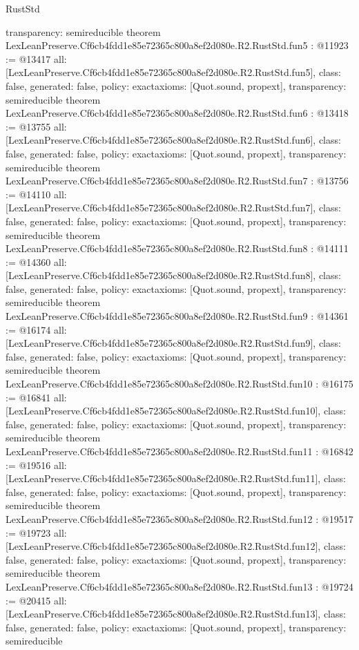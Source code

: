 \begin{lexlean}{RustStd}
\begin{coremodule}
{  transparency: semireducible
}
theorem LexLeanPreserve.Cf6cb4fdd1e85e72365c800a8ef2d080e.R2.RustStd.fun5 : @11923 := @13417 {
  all: [LexLeanPreserve.Cf6cb4fdd1e85e72365c800a8ef2d080e.R2.RustStd.fun5],
  class: false,
  generated: false,
  policy: exact{axioms: [Quot.sound, propext]},
  transparency: semireducible
}
theorem LexLeanPreserve.Cf6cb4fdd1e85e72365c800a8ef2d080e.R2.RustStd.fun6 : @13418 := @13755 {
  all: [LexLeanPreserve.Cf6cb4fdd1e85e72365c800a8ef2d080e.R2.RustStd.fun6],
  class: false,
  generated: false,
  policy: exact{axioms: [Quot.sound, propext]},
  transparency: semireducible
}
theorem LexLeanPreserve.Cf6cb4fdd1e85e72365c800a8ef2d080e.R2.RustStd.fun7 : @13756 := @14110 {
  all: [LexLeanPreserve.Cf6cb4fdd1e85e72365c800a8ef2d080e.R2.RustStd.fun7],
  class: false,
  generated: false,
  policy: exact{axioms: [Quot.sound, propext]},
  transparency: semireducible
}
theorem LexLeanPreserve.Cf6cb4fdd1e85e72365c800a8ef2d080e.R2.RustStd.fun8 : @14111 := @14360 {
  all: [LexLeanPreserve.Cf6cb4fdd1e85e72365c800a8ef2d080e.R2.RustStd.fun8],
  class: false,
  generated: false,
  policy: exact{axioms: [Quot.sound, propext]},
  transparency: semireducible
}
theorem LexLeanPreserve.Cf6cb4fdd1e85e72365c800a8ef2d080e.R2.RustStd.fun9 : @14361 := @16174 {
  all: [LexLeanPreserve.Cf6cb4fdd1e85e72365c800a8ef2d080e.R2.RustStd.fun9],
  class: false,
  generated: false,
  policy: exact{axioms: [Quot.sound, propext]},
  transparency: semireducible
}
theorem LexLeanPreserve.Cf6cb4fdd1e85e72365c800a8ef2d080e.R2.RustStd.fun10 : @16175 := @16841 {
  all: [LexLeanPreserve.Cf6cb4fdd1e85e72365c800a8ef2d080e.R2.RustStd.fun10],
  class: false,
  generated: false,
  policy: exact{axioms: [Quot.sound, propext]},
  transparency: semireducible
}
theorem LexLeanPreserve.Cf6cb4fdd1e85e72365c800a8ef2d080e.R2.RustStd.fun11 : @16842 := @19516 {
  all: [LexLeanPreserve.Cf6cb4fdd1e85e72365c800a8ef2d080e.R2.RustStd.fun11],
  class: false,
  generated: false,
  policy: exact{axioms: [Quot.sound, propext]},
  transparency: semireducible
}
theorem LexLeanPreserve.Cf6cb4fdd1e85e72365c800a8ef2d080e.R2.RustStd.fun12 : @19517 := @19723 {
  all: [LexLeanPreserve.Cf6cb4fdd1e85e72365c800a8ef2d080e.R2.RustStd.fun12],
  class: false,
  generated: false,
  policy: exact{axioms: [Quot.sound, propext]},
  transparency: semireducible
}
theorem LexLeanPreserve.Cf6cb4fdd1e85e72365c800a8ef2d080e.R2.RustStd.fun13 : @19724 := @20415 {
  all: [LexLeanPreserve.Cf6cb4fdd1e85e72365c800a8ef2d080e.R2.RustStd.fun13],
  class: false,
  generated: false,
  policy: exact{axioms: [Quot.sound, propext]},
  transparency: semireducible
}
\end{coremodule}
\end{lexlean}
